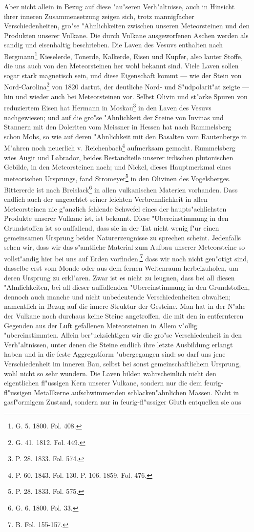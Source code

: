 \documentclass[a4paper, 8pt, oneside, polutonikogreek, german]{article}
\begin{document}
Aber nicht allein in Bezug auf diese "au"seren Verh"altnisse, auch in Hinsicht ihrer inneren Zusammensetzung zeigen sich, trotz mannigfacher Verschiedenheiten, gro"se "Ahnlichkeiten zwischen unseren Meteorsteinen und den Produkten unserer Vulkane. Die durch Vulkane ausgeworfenen Aschen werden als sandig und eisenhaltig beschrieben. Die Laven des Vesuvs enthalten nach Bergmann\footnote{G. 5. 1800. Fol. 408.} Kieselerde, Tonerde, Kalkerde, Eisen und Kupfer, also lauter Stoffe, die uns auch von den Meteorsteinen her wohl bekannt sind. Viele Laven sollen sogar stark magnetisch sein, und diese Eigenschaft kommt --- wie der Stein von Nord-Carolina\footnote{G. 41. 1812. Fol. 449.} von 1820 dartut, der deutliche Nord- und S"udpolarit"at zeigte --- hin und wieder auch bei Meteorsteinen vor. Selbst Olivin und st"arke Spuren von reduziertem Eisen hat Hermann in Moskau\footnote{P. 28. 1833. Fol. 574.} in den Laven des Vesuvs nachgewiesen; und auf die gro"se "Ahnlichkeit der Steine von Invinas und Stannern mit den Doleriten vom Meissner in Hessen hat nach Rammelsberg schon Mohs, so wie auf deren "Ahnlichkeit mit den Basalten vom Rautenberge in M"ahren noch neuerlich v. Reichenbach\footnote{P. 60. 1843. Fol. 130. P. 106. 1859. Fol. 476.} aufmerksam gemacht. Rummelsberg wies Augit und Labrador, beides Bestandteile unserer irdischen plutonischen Gebilde, in den Meteorsteinen nach; und Nickel, dieses Hauptmerkmal eines meteorischen Ursprungs, fand Stromeyer\footnote{P. 28. 1833. Fol. 575.} in den Olivinen des Vogelsberges. Bittererde ist nach Breislack\footnote{G. 6. 1800. Fol. 33.} in allen vulkanischen Materien vorhanden. Dass endlich auch der ungeachtet seiner leichten Verbrennlichkeit in allen Meteorsteinen nie g"anzlich fehlende Schwefel eines der haupts"achlichsten Produkte unserer Vulkane ist, ist bekannt. Diese "Ubereinstimmung in den Grundstoffen ist so auffallend, dass sie in der Tat nicht wenig f"ur einen gemeinsamen Ursprung beider Naturerzeugnisse zu sprechen scheint. Jedenfalls sehen wir, dass wir das s"amtliche Material zum Aufbau unserer Meteorsteine so vollst"andig hier bei uns auf Erden vorfinden,\footnote{B. Fol. 155-157.} dass wir noch nicht gen"otigt sind, dasselbe erst vom Monde oder aus dem fernen Weltenraum herbeizuholen, um deren Ursprung zu erkl"aren. Zwar ist es nicht zu leugnen, dass bei all diesen "Ahnlichkeiten, bei all dieser auffallenden "Ubereinstimmung in den Grundstoffen, dennoch auch manche und nicht unbedeutende Verschiedenheiten obwalten; namentlich in Bezug auf die innere Struktur der Gesteine. Man hat in der N"ahe der Vulkane noch durchaus keine Steine angetroffen, die mit den in entfernteren Gegenden aus der Luft gefallenen Meteorsteinen in Allem v"ollig "ubereinstimmten. Allein ber"ucksichtigen wir die gro"se Verschiedenheit in den Verh"altnissen, unter denen die Steine endlich ihre letzte Ausbildung erlangt haben und in die feste Aggregatform "ubergegangen sind: so darf uns jene Verschiedenheit im inneren Bau, selbst bei sonst gemeinschaftlichem Ursprung, wohl nicht so sehr wundern. Die Laven bilden wahrscheinlich nicht den eigentlichen fl"ussigen Kern unserer Vulkane, sondern nur die dem feurig-fl"ussigen Metallkerne aufschwimmenden schlacken"ahnlichen Massen. Nicht in gasf"ormigem Zustand, sondern nur in feurig-fl"ussiger Gluth entquellen sie aus 
\end{document}
